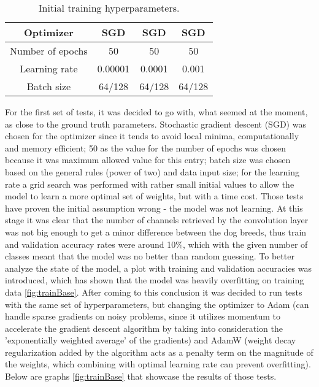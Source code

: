 \documentclass{article} %
\begin{document}
\begin{table}[h!]
\centering
\begin{tabular}{ | c | c | c | c | }
\hline
 Optimizer & SGD  & SGD & SGD\\ 
 \hline
 Number of epochs & 50 & 50 & 50 \\  
 \hline
 Learning rate & 0.00001  & 0.0001 & 0.001 \\
 \hline
 Batch size & 64/128 & 64/128 & 64/128\\
 \hline
\end{tabular}
\caption{Initial training hyperparameters.}
\label{table:1}
\end{table}


For the first set of tests, it was decided to go with, what seemed at the moment, as close to the ground truth parameters. Stochastic gradient descent (SGD) was chosen for the optimizer since it tends to avoid local minima, computationally and memory efficient; 50 as the value for the number of epochs was chosen because it was maximum allowed value for this entry; batch size was chosen based on the general rules (power of two) and data input size; for the learning rate a grid search was performed with rather small initial values to allow the model to learn a more optimal set of weights, but with a time cost.
Those tests have proven the initial assumption wrong - the model was not learning. At this stage it was clear that the number of channels retrieved by the convolution layer was not big enough to get a minor difference between the dog breeds, thus train and validation accuracy rates were around 10\%, which with the given number of classes meant that the model was no better than random guessing. To better analyze the state of the model, a plot with training and validation accuracies was introduced, which has shown that the model was heavily overfitting on training data \ref{fig:trainBase}. After coming to this conclusion it was decided to run tests with the same set of hyperparameters, but changing the optimizer to Adam (can handle sparse gradients on noisy problems, since it utilizes momentum to accelerate the gradient descent algorithm by taking into consideration the 'exponentially weighted average' of the gradients) and AdamW (weight decay regularization added by the algorithm acts as a penalty term on the magnitude of the weights, which combining with optimal learning rate can prevent overfitting). Below are graphs \ref{fig:trainBase} that showcase the results of those tests.
\end{document}
